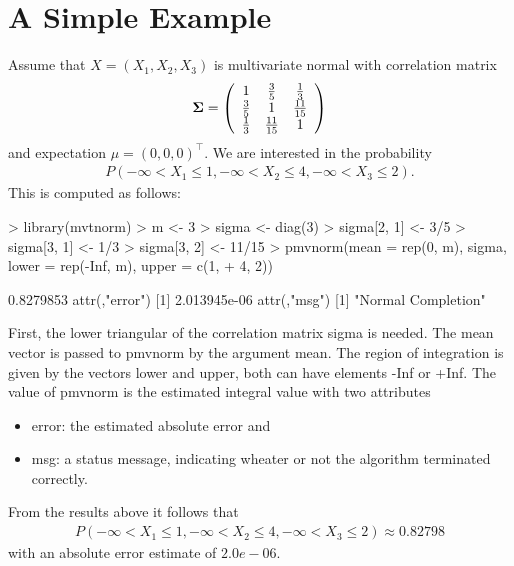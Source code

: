 \documentclass[11pt]{amsart}
\newcommand{\Sig}{\mbox{\boldmath $\Sigma$}}
\begin{document}
\section{A Simple Example \label{simple}}

Assume that $ X = (X_1, X_2, X_3) $ is multivariate normal with correlation
matrix
\begin{eqnarray*}
\Sig = \left( \begin{array}{ccc} 1 & \frac{3}{5} & \frac{1}{3} \\
\frac{3}{5} & 1 & \frac{11}{15} \\
\frac{1}{3} & \frac{11}{15} & 1 \end{array} \right)
\end{eqnarray*}
and expectation $ \mu = (0,0,0)^{\top} $. We are interested in the probability
\begin{eqnarray*}
P(-\infty < X_1 \le 1, -\infty < X_2 \le 4, -\infty < X_3 \le 2).
\end{eqnarray*}
This is computed as follows:
\begin{Schunk}
\begin{Sinput}
> library(mvtnorm)
> m <- 3
> sigma <- diag(3)
> sigma[2, 1] <- 3/5
> sigma[3, 1] <- 1/3
> sigma[3, 2] <- 11/15
> pmvnorm(mean = rep(0, m), sigma, lower = rep(-Inf, m), upper = c(1, 
+     4, 2))
\end{Sinput}
\begin{Soutput}
[1] 0.8279853
attr(,"error")
[1] 2.013945e-06
attr(,"msg")
[1] "Normal Completion"
\end{Soutput}
\end{Schunk}
First, the lower triangular of the correlation matrix {\ttfamily sigma}
is needed. The mean
vector is passed to {\ttfamily pmvnorm} by the argument {\ttfamily mean}.
The region of
integration is given by the vectors {\ttfamily lower} and {\ttfamily upper},
both can have elements {\ttfamily -Inf} or {\ttfamily +Inf}. The value of {\ttfamily pmvnorm}
is the estimated integral value with two attributes 
\begin{itemize}
\item {\ttfamily error}: the estimated absolute error and
\item {\ttfamily msg}: a status message, indicating wheater or not the algorithm
terminated correctly.
\end{itemize}
From the results above it follows that
\begin{eqnarray*}
P(-\infty < X_1 \le 1, -\infty < X_2 \le 4, -\infty < X_3 \le 2) \approx
0.82798
\end{eqnarray*}
with an absolute error estimate of $2.0e-06$.
\end{document}
